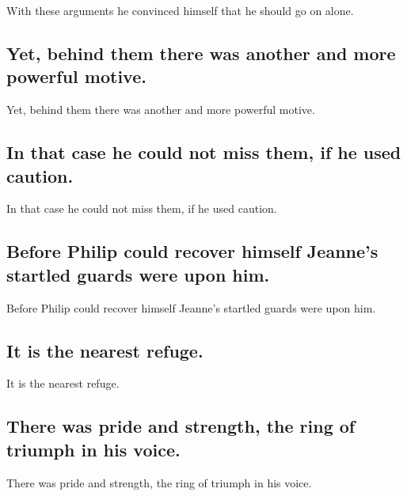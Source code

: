 \documentclass[]{article}
\begin{document}
With these arguments he convinced himself that he should go on alone.

\hypertarget{yet-behind-them-there-was-another-and-more-powerful-motive.}{%
\subsection{Yet, behind them there was another and more powerful
motive.}\label{yet-behind-them-there-was-another-and-more-powerful-motive.}}

Yet, behind them there was another and more powerful motive.

\hypertarget{in-that-case-he-could-not-miss-them-if-he-used-caution.}{%
\subsection{In that case he could not miss them, if he used
caution.}\label{in-that-case-he-could-not-miss-them-if-he-used-caution.}}

In that case he could not miss them, if he used caution.

\hypertarget{before-philip-could-recover-himself-jeannes-startled-guards-were-upon-him.}{%
\subsection{Before Philip could recover himself Jeanne's startled guards
were upon
him.}\label{before-philip-could-recover-himself-jeannes-startled-guards-were-upon-him.}}

Before Philip could recover himself Jeanne's startled guards were upon
him.

\hypertarget{it-is-the-nearest-refuge.}{%
\subsection{It is the nearest refuge.}\label{it-is-the-nearest-refuge.}}

It is the nearest refuge.

\hypertarget{there-was-pride-and-strength-the-ring-of-triumph-in-his-voice.}{%
\subsection{There was pride and strength, the ring of triumph in his
voice.}\label{there-was-pride-and-strength-the-ring-of-triumph-in-his-voice.}}

There was pride and strength, the ring of triumph in his voice.
\end{document}
